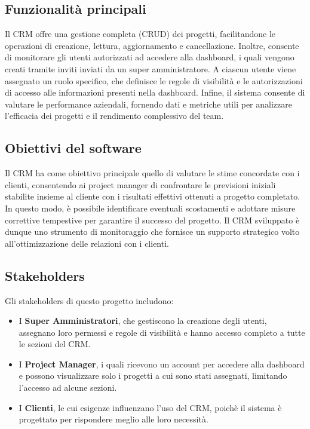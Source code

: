 \documentclass[target=bach,aauheader=,style=]{thud}
\begin{document}
\subsection{Funzionalità principali}
Il CRM offre una gestione completa (CRUD) dei progetti, facilitandone le operazioni di creazione, lettura, aggiornamento e cancellazione. Inoltre, consente di monitorare gli utenti autorizzati ad accedere alla dashboard, i quali vengono creati tramite inviti inviati da un super amministratore. A ciascun utente viene assegnato un ruolo specifico, che definisce le regole di visibilità e le autorizzazioni di accesso alle informazioni presenti nella dashboard. Infine, il sistema consente di valutare le performance aziendali, fornendo dati e metriche utili per analizzare l'efficacia dei progetti e il rendimento complessivo del team.

\subsection{Obiettivi del software}
Il CRM ha come obiettivo principale quello di valutare le stime concordate con i clienti, consentendo ai project manager di confrontare le previsioni iniziali stabilite insieme al cliente con i risultati effettivi ottenuti a progetto completato. In questo modo, è possibile identificare eventuali scostamenti e adottare misure correttive tempestive per garantire il successo del progetto. Il CRM sviluppato è dunque uno strumento di monitoraggio che fornisce un supporto strategico volto all'ottimizzazione delle relazioni con i clienti.

\subsection{Stakeholders}
Gli stakeholders di questo progetto includono:

\begin{itemize}
    \item I \textbf{Super Amministratori}, che gestiscono la creazione degli utenti, assegnano loro permessi e regole di visibilità e hanno accesso completo a tutte le sezioni del CRM. 
    \item I \textbf{Project Manager}, i quali ricevono un account per accedere alla dashboard e possono visualizzare solo i progetti a cui sono stati assegnati, limitando l'accesso ad alcune sezioni.
    \item I \textbf{Clienti}, le cui esigenze influenzano l'uso del CRM, poichè il sistema è progettato per rispondere meglio alle loro necessità.
\end{itemize}
\end{document}
